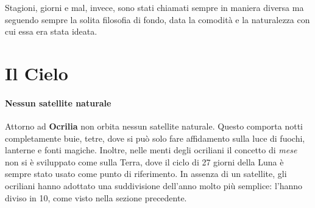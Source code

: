 \documentclass[10pt,twoside,onecolumn,openany]{book}
\begin{document}
Stagioni, giorni e mal, invece, sono stati chiamati sempre in maniera diversa ma seguendo sempre la solita filosofia di fondo, data la comodità e la naturalezza con cui essa era stata ideata.
\newpage
\section{Il Cielo}
\paragraph{Nessun satellite naturale} Attorno ad \textbf{Ocrilia} non orbita nessun satellite naturale. Questo comporta notti completamente buie, tetre, dove si può solo fare affidamento sulla luce di fuochi, lanterne e fonti magiche. Inoltre, nelle menti degli ocriliani il concetto di \textit{mese} non si è sviluppato come sulla Terra, dove il ciclo di 27 giorni della Luna è sempre stato usato come punto di riferimento. In assenza di un satellite, gli ocriliani hanno adottato una suddivisione dell'anno molto più semplice: l'hanno diviso in 10, come visto nella sezione precedente.
\end{document}
